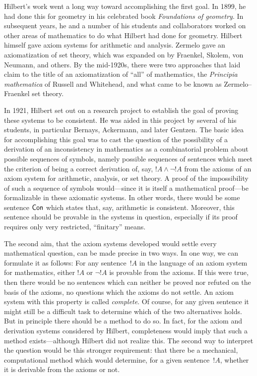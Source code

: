 \documentclass[../../../include/open-logic-section]{subfiles}
\begin{document}
Hilbert's work went a long way toward accomplishing the first goal.
In 1899, he had done this for geometry in his celebrated book
\emph{Foundations of geometry}. In subsequent years, he and a number
of his students and collaborators worked on other areas of mathematics
to do what Hilbert had done for geometry.  Hilbert himself gave axiom
systems for arithmetic and analysis. Zermelo gave an axiomatization of
set theory, which was expanded on by Fraenkel, Skolem, von Neumann,
and others.  By the mid-1920s, there were two approaches that laid
claim to the title of an axiomatization of ``all'' of mathematics, the
\emph{Principia mathematica} of Russell and Whitehead, and what came to
be known as Zermelo--Fraenkel set theory.

In 1921, Hilbert set out on a research project to establish the goal
of proving these systems to be consistent.  He was aided in this
project by several of his students, in particular Bernays, Ackermann,
and later Gentzen. The basic idea for accomplishing this goal was to
cast the question of the possibility of a derivation of an
inconsistency in mathematics as a combinatorial problem about possible
sequences of symbols, namely possible sequences of sentences which
meet the criterion of being a correct derivation of, say, $!A \land
\lnot !A$ from the axioms of an axiom system for arithmetic, analysis,
or set theory.  A proof of the impossibility of such a sequence of
symbols would---since it is itself a mathematical proof---be
formalizable in these axiomatic systems.  In other words, there would
be some sentence $\OCon$ which states that, say, arithmetic is
consistent.  Moreover, this sentence should be provable in the systems
in question, especially if its proof requires only very restricted,
``finitary'' means.

The second aim, that the axiom systems developed would settle every
mathematical question, can be made precise in two ways. In one way, we
can formulate it as follows: For any sentence~$!A$ in the language of
an axiom system for mathematics, either $!A$ or $\lnot !A$ is provable
from the axioms.  If this were true, then there would be no sentences
which can neither be proved nor refuted on the basis of the axioms, no
questions which the axioms do not settle.  An axiom system with this
property is called \emph{complete}. Of course, for any given sentence
it might still be a difficult task to determine which of the two
alternatives holds.  But in principle there should be a method to do
so.  In fact, for the axiom and derivation systems considered by
Hilbert, completeness would imply that such a method exists---although
Hilbert did not realize this.  The second way to interpret the
question would be this stronger requirement: that there be a
mechanical, computational method which would determine, for a given
sentence~$!A$, whether it is derivable from the axioms or not.
\end{document}
